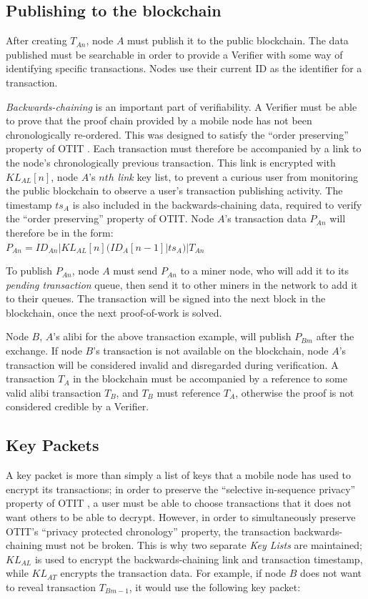 \subsection{Publishing to the blockchain}
After creating $T_{An}$, node $A$ must publish it to the public blockchain. The data published must be searchable in order to provide a Verifier with some way of identifying specific transactions. Nodes use their current ID as the identifier for a transaction.

\textit{Backwards-chaining} is an important part of verifiability. A Verifier must be able to prove that the proof chain provided by a mobile node has not been chronologically re-ordered. This was designed to satisfy the ``order preserving'' property of OTIT \cite{otit}. Each transaction must therefore be accompanied by a link to the node's chronologically previous transaction. This link is encrypted with $KL_{AL}[n]$, node $A$'s $nth$ \textit{link} key list, to prevent a curious user from monitoring the public blockchain to observe a user's transaction publishing activity. The timestamp $ts_A$ is also included in the backwards-chaining data, required to verify the ``order preserving'' property of OTIT. Node $A$'s transaction data $P_{An}$ will therefore be in the form:
\\

$P_{An} = ID_{An}|KL_{AL}[n](ID_{A}[n-1]|ts_A)|T_{An}$

\null
To publish $P_{An}$, node $A$ must send $P_{An}$ to a miner node, who will add it to its \textit{pending transaction} queue, then send it to other miners in the network to add it to their queues. The transaction will be signed into the next block in the blockchain, once the next proof-of-work is solved.

Node $B$, $A$'s alibi for the above transaction example, will publish $P_{Bm}$ after the exchange. If node $B$'s transaction is not available on the blockchain, node $A$'s transaction will be considered invalid and disregarded during verification. A transaction $T_A$ in the blockchain must be accompanied by a reference to some valid alibi transaction $T_B$, and $T_B$ must reference $T_A$, otherwise the proof is not considered credible by a Verifier.

\subsection{Key Packets} \label{sssec:key_packets}
A key packet is more than simply a list of keys that a mobile node has used to encrypt its transactions; in order to preserve the ``selective in-sequence privacy'' property of OTIT \cite{otit}, a user must be able to choose transactions that it does not want others to be able to decrypt. However, in order to simultaneously preserve OTIT's ``privacy protected chronology'' property, the transaction backwards-chaining must not be broken. This is why two separate \textit{Key Lists} are maintained; $KL_{AL}$ is used to encrypt the backwards-chaining link and transaction timestamp, while $KL_{AT}$ encrypts the transaction data. For example, if node $B$ does not want to reveal transaction $T_{Bm-1}$, it would use the following key packet:
\\

